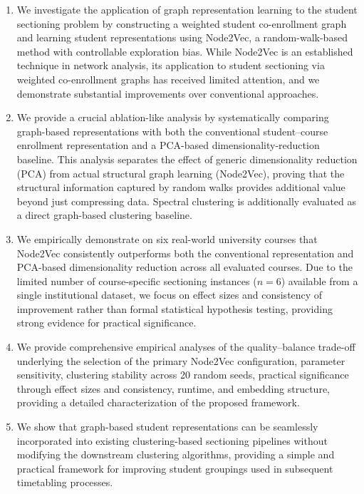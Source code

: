 \documentclass[pdflatex,sn-mathphys-num,iicol]{sn-jnl}%
\theoremstyle{thmstyleone}%
\theoremstyle{thmstyletwo}%
\theoremstyle{thmstylethree}%
\begin{document}
\begin{enumerate}

\item We investigate the application of graph representation learning to the student sectioning problem by constructing a weighted student co-enrollment graph and learning student representations using Node2Vec, a random-walk-based method with controllable exploration bias. While Node2Vec is an established technique in network analysis, its application to student sectioning via weighted co-enrollment graphs has received limited attention, and we demonstrate substantial improvements over conventional approaches.

\item We provide a crucial ablation-like analysis by systematically comparing graph-based representations with both the conventional student--course enrollment representation and a PCA-based dimensionality-reduction baseline. This analysis separates the effect of generic dimensionality reduction (PCA) from actual structural graph learning (Node2Vec), proving that the structural information captured by random walks provides additional value beyond just compressing data. Spectral clustering is additionally evaluated as a direct graph-based clustering baseline.

\item We empirically demonstrate on six real-world university courses that Node2Vec consistently outperforms both the conventional representation and PCA-based dimensionality reduction across all evaluated courses. Due to the limited number of course-specific sectioning instances ($n=6$) available from a single institutional dataset, we focus on effect sizes and consistency of improvement rather than formal statistical hypothesis testing, providing strong evidence for practical significance.

\item We provide comprehensive empirical analyses of the quality--balance trade-off underlying the selection of the primary Node2Vec configuration, parameter sensitivity, clustering stability across 20 random seeds, practical significance through effect sizes and consistency, runtime, and embedding structure, providing a detailed characterization of the proposed framework.

\item We show that graph-based student representations can be seamlessly incorporated into existing clustering-based sectioning pipelines without modifying the downstream clustering algorithms, providing a simple and practical framework for improving student groupings used in subsequent timetabling processes.

\end{enumerate}
\end{document}
